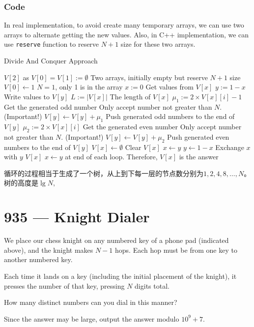 \subsubsection{Code}
In real implementation, to avoid create many temporary arrays, we can use two arrays to alternate getting the new values. Also, in C++ implementation, we can use \texttt{reserve} function to reserve $N+1$ size for these two arrays.
\setcounter{algorithm}{0}
\begin{algorithm}[H]
\caption{Divide And Conquer Approach}
\begin{algorithmic}[1]
\State $V[2]$ as $V[0]=V[1]:=\emptyset$ \Comment Two arrays, initially empty but reserve $N+1$ size
\State $V[0]\gets 1$ \Comment $N=1$, only 1 is in the array
\State $x:=0$ \Comment Get values from $V[x]$
\State $y:=1-x$ \Comment Write values to $V[y]$
\State $L:=\vert V[x]\vert$ \Comment The length of $V[x]$
\State $\mu_1:=2\times V[x][i] - 1$ \Comment Get the generated odd number
 \Comment Only accept number not greater than $N$. (Important!)
\State $V[y] \gets V[y] + \mu_1$ \Comment Push generated odd numbers to the end of $V[y]$
\EndIf
\EndFor
{}
\State $\mu_2:=2\times V[x][i]$ \Comment Get the generated even number
 \Comment Only accept number not greater than $N$. (Important!)
\State $V[y] \gets V[y] + \mu_2$ \Comment Push generated even numbers to the end of $V[y]$
\EndIf
\State $V[x] \gets \emptyset$ \Comment Clear $V[x]$
\State $x\gets y$ 
\State $y\gets 1-x$ \Comment  Exchange $x$ with $y$
\EndFor
\EndWhile
\State \Return $V[x]$ \Comment $x\gets y$ at end of each loop. Therefore, $V[x]$ is the answer
\EndProcedure
\end{algorithmic}
\end{algorithm}
\begin{CJK*}{UTF8}{gbsn}
循环的过程相当于生成了一个树，从上到下每一层的节点数分别为$1,2,4,8,\ldots,N$。 树的高度是$\lg N$,
\end{CJK*}

\section{935 --- Knight Dialer}
We place our chess knight on any numbered key of a phone pad (indicated above), and the knight makes $N-1$ hops.  Each hop must be from one key to another numbered key.
\par
Each time it lands on a key (including the initial placement of the knight), it presses the number of that key, pressing $N$ digits total.
\par
How many distinct numbers can you dial in this manner?
\par
Since the answer may be large, output the answer modulo $10^9 + 7$.
